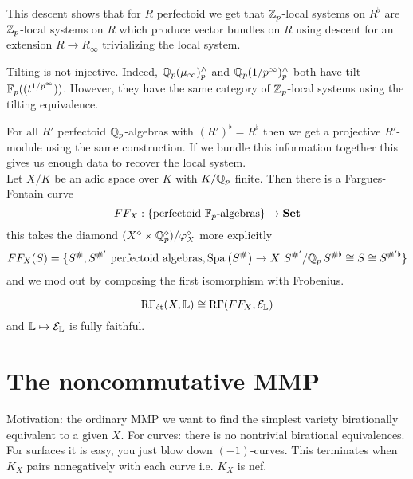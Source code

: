 \documentclass[12pt]{article}
\newcommand{\R}{\mathrm{R}}
\newcommand{\LL}{\mathbb{L}}
\begin{document}
This descent shows that for $R$ perfectoid we get that $\mathbb{Z}_p$-local systems on $R^{\flat}$ are $\mathbb{Z}_p$-local systems on $R$ which produce vector bundles on $R$ using descent for an extension $R \to R_{\infty}$ trivializing the local system. 

\begin{example}
Tilting is not injective. Indeed, $\mathbb{Q}_p(\mu_{\infty})_p^{\wedge}$ and $\mathbb{Q}_p(1/p^{\infty})_p^{\wedge}$ both have tilt $\mathbb{F}_p((t^{1/p^{\infty}}))$. However, they have the same category of $\mathbb{Z}_p$-local systems using the tilting equivalence.
\end{example}

\newcommand{\Spa}[1]{\mathrm{Spa}\left(#1\right)}

For all $R'$ perfectoid $\mathbb{Q}_p$-algebras with $(R')^{\flat} = R^{\flat}$ then we get a projective $R'$-module using the same construction. If we bundle this information together this gives us enough data to recover the local system.
\bigskip\\
Let $X / K$ be an adic space over $K$ with $K / \mathbb{Q}_p$ finite. Then there is a Fargues-Fontain curve 
\[ FF_X : \{ \text{perfectoid } \mathbb{F}_p\text{-algebras} \} \to \mathbf{Set} \]
this takes the diamond $(X^{\diamond} \times \mathbb{Q}_p^{\diamond}) / \varphi_X^{\diamond}$ more explicitly
\[ FF_X(S) = \{ S^{\#}, S^{\#'} \text{ perfectoid algebras}, \Spa{S^{\#}} \to X \, \, S^{\#'} / \Q_p \, S^{\# \flat} \cong S \cong S^{\# ' \flat} \} \]
and we mod out by composing the first isomorphism with Frobenius.


\[ \R \Gamma_{\et}(X, \LL) \cong \R \Gamma(FF_X, \E_{\LL}) \]
and $\LL \mapsto \E_{\LL}$ is fully faithful. 

\section{The noncommutative MMP}

Motivation: the ordinary MMP we want to find the simplest variety birationally equivalent to a given $X$. For curves: there is no nontrivial birational equivalences. For surfaces it is easy, you just blow down $(-1)$-curves. This terminates when $K_X$ pairs nonegatively with each curve i.e. $K_X$ is nef.
\end{document}
